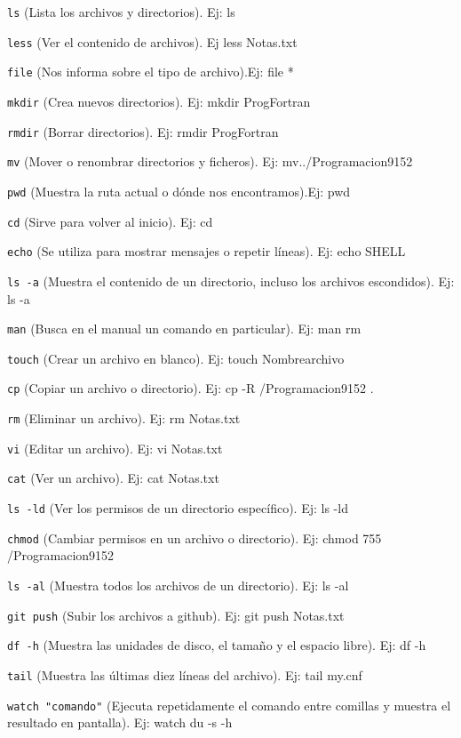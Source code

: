 \documentclass[12pt]{article}
\begin{document}
\begin{description}
\item {\tt ls} (Lista los archivos y directorios). Ej: ls
\item {\tt less} (Ver el contenido de archivos). Ej less Notas.txt
\item {\tt file} (Nos informa sobre el tipo de archivo).Ej: file *
\item {\tt mkdir} (Crea nuevos directorios). Ej: mkdir ProgFortran
\item {\tt rmdir} (Borrar directorios). Ej: rmdir ProgFortran
\item {\tt mv} (Mover o renombrar directorios y ficheros). Ej: mv../Programacion9152
\item {\tt pwd} (Muestra la ruta actual o dónde nos encontramos).Ej: pwd
\item {\tt cd} (Sirve para volver al inicio). Ej: cd
\item {\tt echo} (Se utiliza para mostrar mensajes o repetir líneas). Ej: echo SHELL
\item {\tt ls -a} (Muestra el contenido de un directorio, incluso los archivos escondidos). Ej: ls -a
\item {\tt man} (Busca en el manual un comando en particular). Ej: man rm
\item {\tt touch} (Crear un archivo en blanco). Ej: touch Nombrearchivo
\item {\tt cp} (Copiar un archivo o directorio). Ej: cp -R /Programacion9152 .
\item {\tt rm} (Eliminar un archivo). Ej: rm Notas.txt
\item {\tt vi} (Editar un archivo). Ej: vi Notas.txt
\item {\tt cat} (Ver un archivo). Ej: cat Notas.txt
\item {\tt ls -ld} (Ver los permisos de un directorio específico). Ej: ls -ld
\item {\tt chmod} (Cambiar permisos en un archivo o directorio). Ej: chmod 755 /Programacion9152
\item {\tt ls -al} (Muestra todos los archivos de un directorio). Ej: ls -al
\item {\tt git push} (Subir los archivos a github). Ej: git push Notas.txt
\item {\tt df -h} (Muestra las unidades de disco, el tamaño y el espacio libre). Ej: df -h
\item {\tt tail} (Muestra las últimas diez líneas del archivo). Ej: tail my.cnf
\item {\tt watch "comando"} (Ejecuta repetidamente el comando entre comillas y muestra el resultado en pantalla). Ej: watch du -s -h

\end{description}
\end{document}
